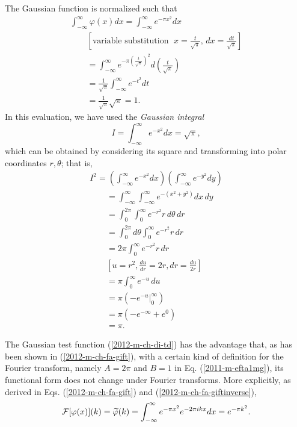 The Gaussian function is normalized such that
\begin{equation}
\begin{split}
\int_{-\infty}^{ \infty} \varphi (x)dx =
\int_{-\infty}^{ \infty} e^{-\pi x^2}dx \\
\qquad [\textrm{variable substitution }\; x = \frac{t}{\sqrt{\pi}}, \, dx = \frac{dt}{\sqrt{\pi}} ]\\
\qquad
= \int_{-\infty}^{ \infty}  e^{-\pi \left(\frac{t}{\sqrt{\pi}}\right)^2}d\left(\frac{t}{\sqrt{\pi}}\right)  \\
\qquad
=\frac{1}{ \sqrt{\pi} } \int_{-\infty}^{ \infty}  e^{- t^2}dt  \\
\qquad
=\frac{1}{\sqrt{\pi} } \sqrt{\pi} = 1.
\end{split}
\end{equation}
In this evaluation, we have used the {\em Gaussian integral}
\begin{equation}
I= \int_{-\infty}^{ \infty}  e^{-x^2}dx=   \sqrt{\pi},
\end{equation}
which can be obtained by considering its square and transforming into polar coordinates $r,\theta$; that  is,
\begin{equation}
\begin{split}
I^2 =
\left(\int_{-\infty}^{ \infty}  e^{-x^2}dx\right)\left(\int_{-\infty}^{ \infty}  e^{-y^2}dy\right)  \\
\qquad =
 \int_{-\infty}^{ \infty} \int_{-\infty}^{ \infty}   e^{-\left(x^2+y^2\right)}dx \,dy   \\
\qquad =
 \int_{0}^{2\pi } \int_{0}^{ \infty}   e^{-r^2}r \, d\theta \,dr   \\
\qquad =
 \int_{0}^{2\pi }  d\theta \int_{0}^{ \infty}   e^{-r^2}r  \,dr   \\
\qquad =
 2\pi   \int_{0}^{ \infty}   e^{-r^2}r  \,dr   \\
\qquad
\left[
u=r^2, \frac{du}{dr} =2r, dr =  \frac{du}{2r}
\right]   \\
\qquad =
  \pi   \int_{0}^{ \infty}   e^{-u}  \,du  \\
\qquad =
  \pi     \left( \left. - e^{-u} \right|_{0}^{ \infty} \right)  \\
\qquad =
  \pi     \left( - e^{-\infty} + e^{0} \right)  \\
\qquad =
  \pi .
\end{split}
\label{2012-m-ch-di-gi2}
\end{equation}

The  Gaussian  test function (\ref{2012-m-ch-di-td})
has the advantage that, as has been shown in
(\ref{2012-m-ch-fa-gift}),
with a certain kind of definition for the Fourier transform,
namely  $A=2\pi $ and $B=1$  in Eq. (\ref{2011-m-efta1mg}),
its functional form does not change under Fourier transforms.
More explicitly, as derived in Eqs.
(\ref{2012-m-ch-fa-gift})
and
(\ref{2012-m-ch-fa-giftinverse}),
\begin{equation}
    {\cal F}[\varphi (x)](k)=\widetilde{\varphi} (k) =  \int_{-\infty}^\infty
                e^{-\pi  x^2}  e^{- 2\pi ikx} dx
 = e^{-{\pi k^2}} .
\end{equation}

